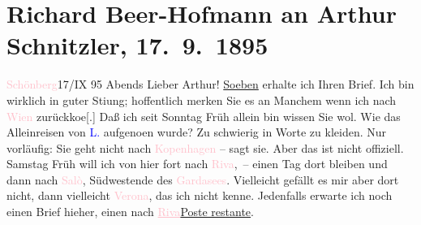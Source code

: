 

               \section[Richard Beer-Hofmann an Arthur Schnitzler, 17. 9. 1895]{ Richard Beer-Hofmann an Arthur Schnitzler, 17. 9. 1895}\nopagebreak{}\rehead{ }\normalsize\beginnumbering{} \toendnotes[C]{\smallbreak\pagebreak[2]} 
\toendnotes[C]{\smallbreak}\pstart
           \raggedleft{}{\pb}\textcolor{pink}{Schönberg}{}\ledrightnote{\textcolor{pink}{Schönberg im Stubaital}}{ }17/IX 95{ }Abends\pend
           \pstart
           Lieber Arthur! \uline{Soeben} erhalte ich Ihren Brief. Ich bin wirklich in
               guter Sti{\geminationm}ung; hoffentlich merken Sie es an Manchem wenn
               ich nach \textcolor{pink}{Wien}{}\ledrightnote{\textcolor{pink}{Wien}} zurückko{\geminationm}e{[}.{]} Daß ich seit Sonntag{ }Früh allein bin wissen Sie wol. Wie das Alleinreisen von \textcolor{blue}{L.}{}\ledrightnote{\textcolor{blue}{Lou Andreas-Salomé}} aufgeno{\geminationm}en wurde?
               Zu schwierig in Worte zu kleiden. Nur vorläufig: Sie geht nicht nach \textcolor{pink}{Kopenhagen}{}\ledrightnote{\textcolor{pink}{Kopenhagen}} – sagt sie. Aber das ist nicht offiziell. Samstag{ }\introOben{}Früh\introOben{} will ich von {\pb}hier fort nach
                  \textcolor{pink}{Riva}{}\ledrightnote{\textcolor{pink}{Riva del Garda}}, – einen Tag dort bleiben und dann nach \textcolor{pink}{Salò}{}\ledrightnote{\textcolor{pink}{Salò}}, Südwestende des \textcolor{pink}{Gardasees}{}\ledrightnote{\textcolor{pink}{Lago di Garda}}. Vielleicht gefällt es mir aber dort nicht, dann vielleicht \textcolor{pink}{Verona}{}\ledrightnote{\textcolor{pink}{Verona}}, das ich nicht kenne. Jedenfalls erwarte ich
               noch einen Brief hieher, einen nach \textcolor{pink}{\uline{Riva}}{}\ledrightnote{\textcolor{pink}{Riva del Garda}}{ }\uline{Poste restante}.\pend
